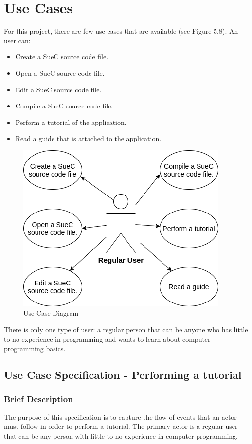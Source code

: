 \documentclass[12pt,a4paper,twoside]{report}
\begin{document}
\section{Use Cases}
 For this project, there are few use cases that are available (see Figure 5.8). An user can:
 \begin{itemize}
 \item Create a SueC source code file.
 \item Open a SueC source code file.
 \item Edit a SueC source code file.
 \item Compile a SueC source code file.
 \item Perform a tutorial of the application.
 \item Read a guide that is attached to the application.
 \end{itemize}
 
\begin{figure}[H]
    \centering
    \includegraphics[width=0.6\linewidth]{img/diags/UseCaseDiag.png}
    \caption{Use Case Diagram}
    \label{fig:conf}
\end{figure}

There is only one type of user: a regular person that can be anyone who has little to no experience in programming and wants to learn about computer programming basics. 

\subsection{Use Case Specification - Performing a tutorial}

\subsubsection{Brief Description}

The purpose of this specification is to capture the flow of events that an actor must follow in order to perform a tutorial. The primary actor is a regular user that can be any person with little to no experience in computer programming. 
\end{document}
